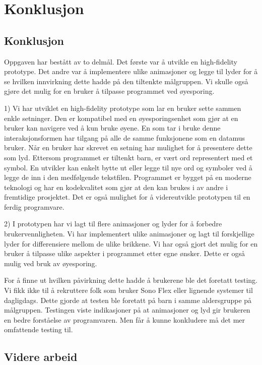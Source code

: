 \chapter{Konklusjon}

\section{Konklusjon}

Oppgaven har bestått av to delmål. Det første var å utvikle en high-fidelity prototype. Det andre var å implementere ulike animasjoner og legge til lyder for å se hvilken innvirkning dette hadde på den tiltenkte målgruppen. Vi skulle også gjøre det mulig for en bruker å  tilpasse programmet ved øyesporing. 

1) Vi har utviklet en high-fidelity prototype som lar en bruker sette sammen enkle setninger. Den er kompatibel med en øyesporingsenhet som gjør at en bruker kan navigere ved å kun bruke øyene. En som tar i bruke denne interaksjonsformen har tilgang på alle de samme funksjonene som en datamus bruker. Når en bruker har skrevet en setning har mulighet for å presentere dette som lyd. Ettersom programmet er tiltenkt barn, er vært ord representert med et symbol. En utvikler kan enkelt bytte ut eller legge til nye ord og symboler ved å legge de inn i den medfølgende tekstfilen. Programmet er bygget på en moderne teknologi og har en kodekvalitet som gjør at den kan brukes i av andre i fremtidige prosjektet. Det er også mulighet for å videreutvikle prototypen til en ferdig programvare. 

2) I prototypen har vi lagt til flere animasjoner og lyder for å forbedre brukervennligheten. Vi har implementert ulike animasjoner og lagt til forskjellige lyder for differensiere mellom de ulike brikkene. Vi har også gjort det mulig for en bruker å tilpasse ulike aspekter i programmet etter egne ønsker. Dette er også mulig ved bruk av øyesporing. 

For å finne ut hvilken påvirkning dette hadde å brukerene ble det foretatt testing. Vi fikk ikke til å rekruttere folk som bruker Sono Flex eller lignende systemer til dagligdags. Dette gjorde at testen ble foretatt på barn i samme aldersgruppe på målgruppen. Testingen viste indikasjoner på at animasjoner og lyd gir brukeren en bedre forståelse av programvaren. Men får å kunne konkludere må det mer omfattende testing til.


\section{Videre arbeid}

